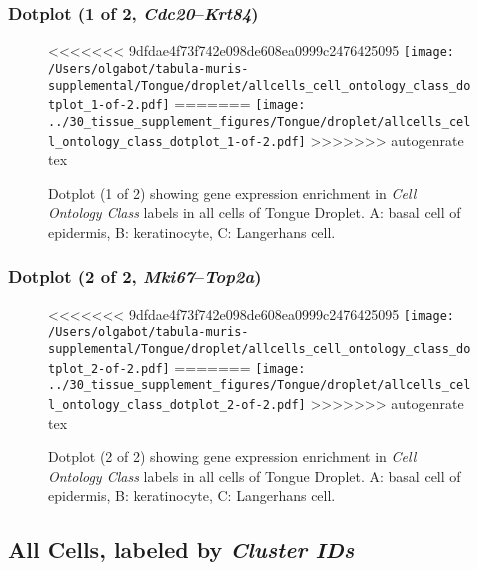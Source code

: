 \clearpage

\subsubsection{Dotplot (1 of 2, \emph{Cdc20}--\emph{Krt84})}
\begin{figure}[h]
\centering
<<<<<<< 9dfdae4f73f742e098de608ea0999c2476425095
\texttt{[image: /Users/olgabot/tabula-muris-supplemental/Tongue/droplet/allcells\_cell\_ontology\_class\_dotplot\_1-of-2.pdf]}
=======
\texttt{[image: ../30\_tissue\_supplement\_figures/Tongue/droplet/allcells\_cell\_ontology\_class\_dotplot\_1-of-2.pdf]}
>>>>>>> autogenrate tex

\caption{ Dotplot (1 of 2)  showing gene expression enrichment in \emph{Cell Ontology Class} labels in all cells of Tongue Droplet. A: basal cell of epidermis, B: keratinocyte, C: Langerhans cell.}
\end{figure}


\clearpage

\subsubsection{Dotplot (2 of 2, \emph{Mki67}--\emph{Top2a})}
\begin{figure}[h]
\centering
<<<<<<< 9dfdae4f73f742e098de608ea0999c2476425095
\texttt{[image: /Users/olgabot/tabula-muris-supplemental/Tongue/droplet/allcells\_cell\_ontology\_class\_dotplot\_2-of-2.pdf]}
=======
\texttt{[image: ../30\_tissue\_supplement\_figures/Tongue/droplet/allcells\_cell\_ontology\_class\_dotplot\_2-of-2.pdf]}
>>>>>>> autogenrate tex

\caption{ Dotplot (2 of 2)  showing gene expression enrichment in \emph{Cell Ontology Class} labels in all cells of Tongue Droplet. A: basal cell of epidermis, B: keratinocyte, C: Langerhans cell.}
\end{figure}


\clearpage

\subsection{All Cells, labeled by \emph{Cluster IDs}}
